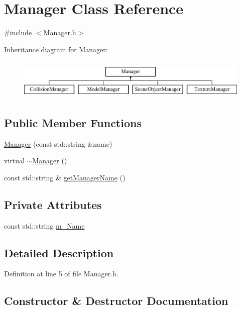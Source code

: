 \hypertarget{class_manager}{}\section{Manager Class Reference}
\label{class_manager}


{\ttfamily \#include $<$Manager.\+h$>$}

Inheritance diagram for Manager\+:\begin{figure}[H]
\begin{center}
\leavevmode
\includegraphics[height=1.944445cm]{class_manager}
\end{center}
\end{figure}
\subsection*{Public Member Functions}
\begin{DoxyCompactItemize}
\item 
\hyperlink{class_manager_ad9b5fb92579e44002e96f9df8fbdc984}{Manager} (const std\+::string \&name)
\item 
virtual \hyperlink{class_manager_a3dbc694b640c70009c5e0dec515d692c}{$\sim$\+Manager} ()
\item 
const std\+::string \& \hyperlink{class_manager_a842a5e896bd2bc7048f7580b5b7e0c7f}{get\+Manager\+Name} ()
\end{DoxyCompactItemize}
\subsection*{Private Attributes}
\begin{DoxyCompactItemize}
\item 
const std\+::string \hyperlink{class_manager_a746ab3e8df717773513e662ad7305259}{m\+\_\+\+Name}
\end{DoxyCompactItemize}


\subsection{Detailed Description}


Definition at line 5 of file Manager.\+h.



\subsection{Constructor \& Destructor Documentation}
